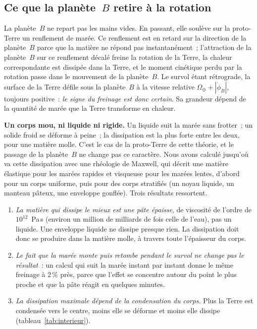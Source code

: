 \documentclass[11pt,a4paper]{article}
\begin{document}
\subsection{Ce que la planète~$B$ retire à la rotation}
\label{sec:despin}

La planète~$B$ ne repart pas les mains vides. En passant, elle soulève sur la proto-Terre un renflement de marée. Ce renflement est en retard sur la direction de la planète~$B$ parce que la matière ne répond pas instantanément~; l'attraction de la planète~$B$ sur ce renflement décalé freine la rotation de la Terre, la chaleur correspondante est dissipée dans la Terre, et le moment cinétique perdu par la rotation passe dans le mouvement de la planète~$B$. Le survol étant rétrograde, la surface de la Terre défile sous la planète~$B$ à la vitesse relative $\Omega_\oplus+|\dot\phi_B|$, toujours positive~: \emph{le signe du freinage est donc certain}. Sa grandeur dépend de la quantité de marée que la Terre transforme en chaleur.

\textbf{Un corps mou, ni liquide ni rigide.} Un liquide suit la marée sans frotter~; un solide froid se déforme à peine~; la dissipation est la plus forte entre les deux, pour une matière molle. C'est le cas de la proto-Terre de cette théorie, et le passage de la planète~$B$ ne change pas ce caractère. Nous avons calculé jusqu'où va cette dissipation avec une rhéologie de Maxwell, qui décrit une matière élastique pour les marées rapides et visqueuse pour les marées lentes, d'abord pour un corps uniforme, puis pour des corps stratifiés (un noyau liquide, un manteau pâteux, une enveloppe gonflée). Trois résultats ressortent.

\begin{enumerate}[leftmargin=1.6em,itemsep=2pt]
\item \emph{La matière qui dissipe le mieux est une pâte épaisse}, de viscosité de l'ordre de $10^{12}$~Pa\,s (environ un million de milliards de fois celle de l'eau), pas un liquide. Une enveloppe liquide ne dissipe presque rien. La dissipation doit donc se produire dans la matière molle, à travers toute l'épaisseur du corps.
\item \emph{Le fait que la marée monte puis retombe pendant le survol ne change pas le résultat}~: un calcul qui suit la marée instant par instant donne le même freinage à $2\,\%$ près, parce que l'effet se concentre autour du point le plus proche et que la pâte réagit en quelques minutes.
\item \emph{La dissipation maximale dépend de la condensation du corps.} Plus la Terre est condensée vers le centre, moins elle se déforme et moins elle dissipe (tableau~\ref{tab:interieur}).
\end{enumerate}
\end{document}

